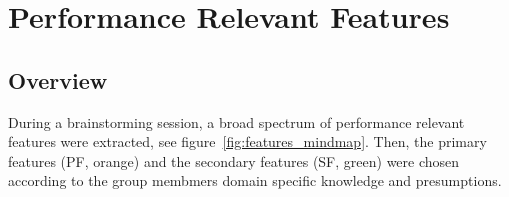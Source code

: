 \documentclass[milestone1.tex]{subfiles}
\begin{document}
\section{Performance Relevant Features}
\subsection{Overview}

During a brainstorming session, a broad spectrum of performance relevant features were extracted, see figure~\ref{fig:features_mindmap}. Then, the primary features (PF, orange) and the secondary features (SF, green) were chosen according to the group membmers domain specific knowledge and presumptions.



    
\end{document}
